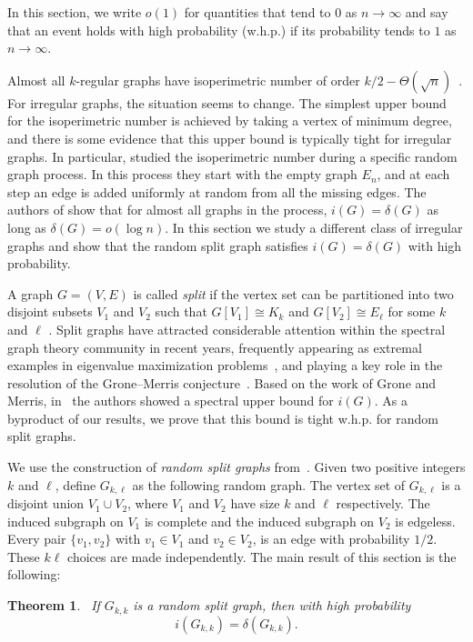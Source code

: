\documentclass[a4paper,11pt]{article}
\newtheorem{theorem}{Theorem}[section]
\theoremstyle{definition}
\begin{document}
In this section, we write $o(1)$ for quantities that tend to $0$ as $n \to \infty$ and say that an event holds with high probability (w.h.p.) if its probability tends to $1$ as $n \to \infty$.

Almost all $k$-regular graphs have isoperimetric number of order $k/2 - \Theta(\sqrt{n})$~\cite{Bollobas1988, Alon1986}. For irregular graphs, the situation seems to change. The simplest upper bound for the isoperimetric number is achieved by taking a vertex of minimum degree, and there is some evidence that this upper bound is typically tight for irregular graphs. In particular, \cite{BHKL2008} studied the isoperimetric number during a specific random graph process. In this process they start with the empty graph $E_n$, and at each step an edge is added uniformly at random from all the missing edges. The authors of \cite{BHKL2008} show that for almost all graphs in the process, $i(G) = \delta(G)$ as long as $\delta(G) = o(\log n)$. In this section we study a different class of irregular graphs and show that the random split graph satisfies $i(G) = \delta(G)$ with high probability. 

A graph $G = (V,E)$ is called \emph{split} if the vertex set can be partitioned into two disjoint subsets $V_1$ and $V_2$ such that $G[V_1] \cong K_k$ and $G[V_2] \cong E_\ell$ for some \(k\) and \(\ell\) \cite[Definition~3.2.3]{BLS1999}. Split graphs have attracted considerable attention within the spectral graph theory community in recent years, frequently appearing as extremal examples in eigenvalue maximization problems~\cite{byrne2024}, and playing a key role in the resolution of the Grone–Merris conjecture~\cite{bai2011}. Based on the work of Grone and Merris, in~\cite{AFHP2014} the authors showed a spectral upper bound for $i(G)$. As a byproduct of our results, we prove that this bound is tight w.h.p. for random split graphs.

We use the construction of \emph{random split graphs} from~\cite{BGM2017}. Given two positive integers $k$ and $\ell$, define $G_{k, \ell}$ as the following random graph. The vertex set of $G_{k, \ell}$ is a disjoint union \(V_1\cup V_2\), where \(V_1\) and \(V_2\) have size $k$ and $\ell$ respectively. The induced subgraph on \(V_1\) is complete and the induced subgraph on \(V_2\) is edgeless. Every pair \(\{v_1,v_2\}\) with \(v_1\in V_1\) and \(v_2\in V_2\), is an edge with probability \(1/2\). These $k\ell$ choices are made independently. The main result of this section is the following:

\begin{theorem}~\label{thm:iG_random_split_graphs}
    If $G_{k, k}$ is a random split graph, then with high probability
    \begin{equation*}
        i(G_{k, k}) = \delta(G_{k, k}).
    \end{equation*}
\end{theorem}
\end{document}
